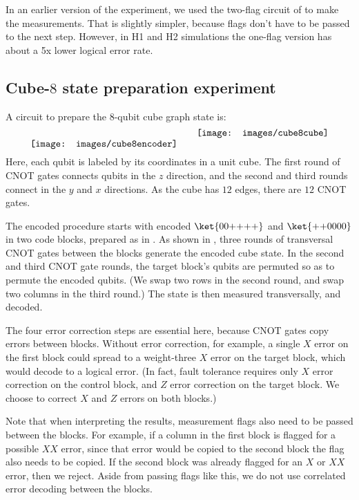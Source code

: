 \documentclass[10pt, twocolumn, aps, nofootinbib, longbibliography, nobibnotes, superscriptaddress]{revtex4-1} %
\begin{document}
In an earlier version of the experiment, we used the two-flag circuit of  to make the measurements.  That is slightly simpler, because flags don't have to be passed to the next step.  However, in H1 and H2 simulations the one-flag version has about a 5x lower logical error rate.  


\subsection{Cube-$8$ state preparation experiment}

A circuit to prepare the %
$8$-qubit cube graph state is: 
$$
\texttt{[image: images/cube8encoder]}
\qquad
\raisebox{.4cm}{\texttt{[image: images/cube8cube]}}
$$
Here, each qubit is labeled by its coordinates in a unit cube.  The first round of CNOT gates connects qubits in the $z$ direction, and the second and third rounds connect in the $y$ and $x$ directions.  
As the cube has $12$ edges, there are $12$ CNOT gates.  

The encoded procedure starts with encoded $\ket{00{+}{+}{+}{+}}$ and $\ket{{+}{+}0000}$ in two code blocks, prepared as in .  As shown in , three rounds of transversal CNOT gates between the blocks generate the encoded cube state.  
In the second and third CNOT gate rounds, the target block's qubits are permuted so as to permute the encoded qubits.  (We swap two rows in the second round, and swap two columns in the third round.)  
The state is then measured transversally, and decoded.  

The four error correction steps are essential here, because CNOT gates copy errors between blocks.  Without error correction, for example, a single $X$ error on the first block could spread to a weight-three $X$ error on the target block, which would decode to a logical error.  (In fact, fault tolerance requires only $X$ error correction on the control block, and $Z$ error correction on the target block.  We choose to correct $X$ and $Z$ errors on both blocks.)  

Note that when interpreting the results, measurement flags also need to be passed between the blocks.  For example, if a column in the first block is flagged for a possible $XX$ error, since that error would be copied to the second block the flag also needs to be copied.  If the second block was already flagged for an $X$ or $XX$ error, then we reject.  Aside from passing flags like this, we do not use correlated error decoding between the blocks.  
\end{document}
